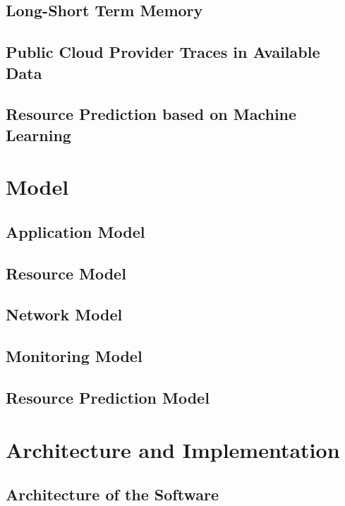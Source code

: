 \documentclass{report}
\begin{document}
    \section{Long-Short Term Memory}
    \section{Public Cloud Provider Traces in Available Data}
    \section{Resource Prediction based on Machine Learning}
  
  \chapter{Model} %

    \section{Application Model}
    \section{Resource Model}
    \section{Network Model}
    \section{Monitoring Model}
    \section{Resource Prediction Model}

  \chapter{Architecture and Implementation}

    \section{Architecture of the Software}
\end{document}
